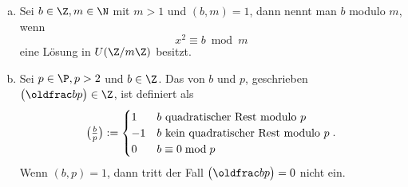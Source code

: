 \begin{df} \label{2.13}
	\begin{enumerate}[a)]
		\item
		Sei $b \in \Z, m \in \N$ mit $m > 1$ und $(b, m) = 1$, dann nennt man $b$  modulo $m$, wenn
		\[
			x^2 \equiv b \bmod m
		\]
		eine Lösung in $U(\Z / m\Z)$ besitzt.
		\item
			Sei $p \in \P, p > 2$ und $b \in \Z$.
			Das  von $b$ und $p$, geschrieben $\legsym bp \in \Z$, ist definiert als
			\[
				\legsym bp := \begin{cases}
					1 & \text{$b$ quadratischer Rest modulo $p$} \\
					-1 & \text{$b$ kein quadratischer Rest modulo $p$} \\
					0 & \text{$b \equiv 0 \bmod p$}
				\end{cases}.
			\]
			Wenn $(b, p) = 1$, dann tritt der Fall $\legsym bp = 0$ nicht ein.
	\end{enumerate}
\end{df}


